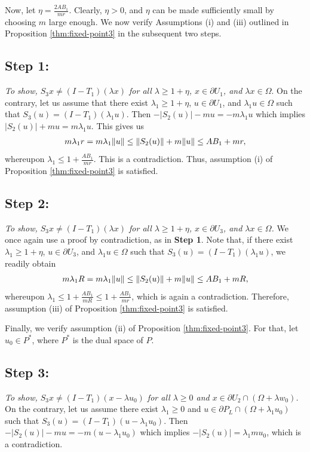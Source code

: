 \documentclass[reqno, 12pt]{amsart}
\numberwithin{equation}{section}
\begin{document}
Now, let $\eta=\frac{2AB_1}{mr}$. Clearly, \( \eta > 0 \), and \( \eta \) can be made sufficiently small by choosing \( m \) large enough.
We now verify Assumptions (i) and (iii) outlined in Proposition \ref{thm:fixed-point3} in the subsequent two steps.

\subsection{Step 1:} { \it To show, $S_3x \neq (I - T_1)(\lambda x)$ for all $\lambda \geq 1 + \eta$, $x \in \partial U_1$, and $\lambda x \in \Omega$}. On the contrary, let us assume that there exist $\lambda_1 \geq 1 + \eta$, $u \in \partial U_1$, and $\lambda_1 u \in \Omega$ such that $S_3(u) = (I - T_1)(\lambda_1 u)$. Then $
- |S_2(u)| - m u = -m\lambda_1 u $ which implies $|S_2(u)|+m u = m\lambda_1 u.$ This gives us
\begin{align}
m\lambda_1 r=m\lambda_1\|u\|\leq \|S_2(u)\|+m\|u\|\leq AB_1+mr,\notag
\end{align}
whereupon $\lambda_1\leq 1+\frac{AB_1}{mr}$.
This  is a contradiction.  Thus, assumption (i) of Proposition \ref{thm:fixed-point3} is satisfied.

\subsection{Step 2:}{\it To show, $S_3x \neq (I - T_1)(\lambda x)$ for all $\lambda \geq 1 + \eta$, $x \in \partial U_3$, and $\lambda x \in \Omega$.} We once again use a proof by contradiction, as in \textbf{Step 1}.
Note that, if there exist $\lambda_1 \geq 1 + \eta$, $u \in \partial U_3$, and $\lambda_1 u \in \Omega$ such that $S_3(u) = (I - T_1)(\lambda_1 u)$, we readily obtain
\begin{align}
m\lambda_1 R=m\lambda_1\|u\|\leq \|S_2(u)\|+m\|u\|\leq AB_1+mR,\notag
\end{align}
whereupon $\lambda_1\leq 1+\frac{AB_1}{mR}\leq 1+\frac{AB_1}{mr}$,
which is again a contradiction. Therefore, assumption (iii) of Proposition \ref{thm:fixed-point3} is satisfied.

\vspace{0.1 in}

\noindent Finally, we verify assumption (ii) of Proposition \ref{thm:fixed-point3}. For that, let $u_0 \in P^*$, where $P^*$ is the dual space of $P$.
\subsection{Step 3:} {\it To show, $S_3x \neq (I - T_1)(x - \lambda u_0)$ for all $\lambda \geq 0$ and $x \in \partial U_2 \cap (\Omega + \lambda w_0)$.} On the contrary, let us assume there exist $\lambda_1 \geq 0$ and $u \in \partial P_L \cap (\Omega + \lambda_1 u_0)$ such that $S_3(u) = (I - T_1)(u - \lambda_1 u_0)$. Then
$- |S_2(u)| - m u  = -m(u - \lambda_1 u_0)$ which implies $-|S_2(u)| = \lambda_1 mu_0 $, which is a contradiction.
\end{document}
